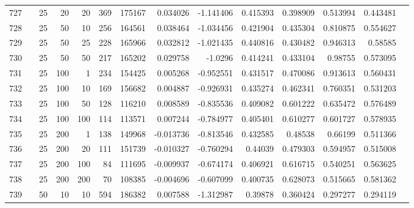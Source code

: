 \begin{longtable}{llrrrrrrrrrrrr}
		727 & &           25 &                20 &           20 &         369 &     175167 &  0.034026 & -1.141406 &  0.415393 &    0.398909 &       0.513994 &  0.443481 \\
		728 & &           25 &                50 &           10 &         256 &     164561 &  0.038464 & -1.034456 &  0.421904 &    0.435304 &       0.810875 &  0.554627 \\
		729 & &           25 &                50 &           25 &         228 &     165966 &  0.032812 & -1.021435 &  0.440816 &    0.430482 &       0.946313 &   0.58585 \\
		730 & &           25 &                50 &           50 &         217 &     165202 &  0.029758 &   -1.0296 &  0.414241 &    0.433104 &        0.98755 &  0.573095 \\
		731 & &           25 &               100 &            1 &         234 &     154425 &  0.005268 & -0.952551 &  0.431517 &    0.470086 &       0.913613 &  0.560431 \\
		732 & &           25 &               100 &           10 &         169 &     156682 &  0.004887 & -0.926931 &  0.435274 &    0.462341 &       0.760351 &  0.531203 \\
		733 & &           25 &               100 &           50 &         128 &     116210 &  0.008589 & -0.835536 &  0.409082 &    0.601222 &       0.635472 &  0.576489 \\
		734 & &           25 &               100 &          100 &         114 &     113571 &  0.007244 & -0.784977 &  0.405401 &    0.610277 &       0.601727 &  0.578935 \\
		735 & &           25 &               200 &            1 &         138 &     149968 & -0.013736 & -0.813546 &  0.432585 &     0.48538 &        0.66199 &  0.511366 \\
		736 & &           25 &               200 &           20 &         111 &     151739 & -0.010327 & -0.760294 &   0.44039 &    0.479303 &       0.594957 &  0.515008 \\
		737 & &           25 &               200 &          100 &          84 &     111695 & -0.009937 & -0.674174 &  0.406921 &    0.616715 &       0.540251 &  0.563625 \\
		738 & &           25 &               200 &          200 &          70 &     108385 & -0.004696 & -0.607099 &  0.400735 &    0.628073 &       0.515665 &  0.581362 \\
		739 & &           50 &                10 &           10 &         594 &     186382 &  0.007588 & -1.312987 &   0.39878 &    0.360424 &       0.297277 &  0.294119 \\

\end{longtable}
